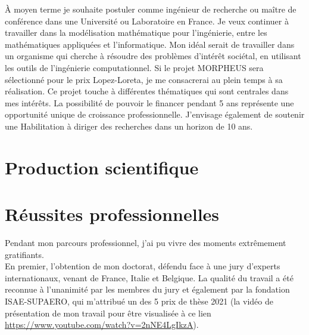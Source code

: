 \documentclass[12pt, french]{article}
\begin{document}
\`A moyen terme je souhaite postuler comme ingénieur de recherche ou maître de conférence dans une Université ou Laboratoire en France. Je veux continuer à travailler dans la modélisation mathématique pour l'ingénierie, entre les mathématiques appliquées et l'informatique. Mon idéal serait de travailler dans un organisme qui cherche à résoudre des problèmes d'intérêt sociétal, en utilisant les outils de l'ingénierie computationnel.  Si le projet MORPHEUS sera sélectionné pour le prix Lopez-Loreta, je me consacrerai au plein temps à sa réalisation. Ce projet touche à différentes thématiques qui sont centrales dans mes intérêts. La possibilité de pouvoir le financer pendant 5 ans représente une opportunité unique de croissance professionnelle. J'envisage également de soutenir une Habilitation à diriger des recherches dans un horizon de 10 ans.


\section{Production scientifique}
{

 
}


\section{Réussites professionnelles}

Pendant mon parcours professionnel, j'ai pu vivre des moments extrêmement gratifiants. \\

En premier, l'obtention de mon doctorat, défendu face à une jury d'experts internationaux, venant de France, Italie et Belgique. La qualité du travail a été reconnue à l'unanimité par les membres du jury et également par la fondation ISAE-SUPAERO, qui m'attribué un des 5 prix de thèse 2021 (la vidéo de présentation de mon travail pour être visualisée à ce lien \url{https://www.youtube.com/watch?v=2nNE4LgIkzA}). \\
 
\end{document}
